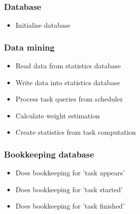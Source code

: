 {	\subsubsection{Database}
	
		\begin{itemize}
			\item Initialise database
		\end{itemize}
		
		\subsubsection{Data mining}
	
			\begin{itemize}
				\item Read data from statistics database
				\item Write data into statistics database
				\item Process task queries from scheduler
				\item Calculate weight estimation 
				\item Create statistics from task computation
			\end{itemize}
	
	
		
		
		\subsubsection{Bookkeeping database}
	
			\begin{itemize}
				\item Does bookkeeping for 'task appears'
				\item Does bookkeeping for 'task started'
				\item Does bookkeeping for 'task finished'
			\end{itemize}
	
}
